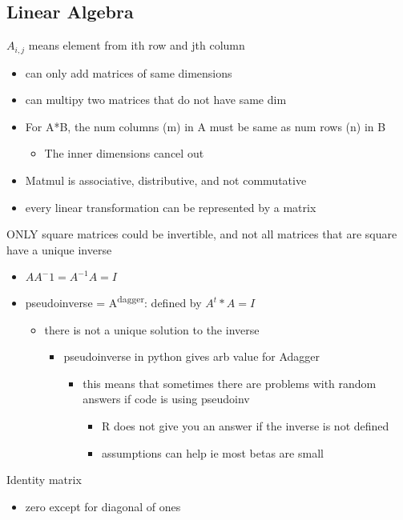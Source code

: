 \documentclass[a4paper]{article}
\begin{document}
\subsection{Linear Algebra}
\label{sec:org61be2e5}
\(A_{i,j}\) means element from ith row and jth column
\begin{itemize}
\item can only add matrices of same dimensions
\item can multipy two matrices that do not have same dim
\item For A*B, the num columns (m) in A must be same as num rows (n) in B
\begin{itemize}
\item The inner dimensions cancel out
\end{itemize}
\item Matmul is associative, distributive, and not commutative
\item every linear transformation can be represented by a matrix
\end{itemize}
ONLY square matrices could be invertible, and not all matrices that are square have a unique inverse
\begin{itemize}
\item \(AA^-1 = A^{-1}A = I\)
\item pseudoinverse = A\textsuperscript{dagger}: defined by \(A^t * A = I\)
\begin{itemize}
\item there is not a unique solution to the inverse
\begin{itemize}
\item pseudoinverse in python gives arb value for Adagger
\begin{itemize}
\item this means that sometimes there are problems with random answers if code is using pseudoinv
\begin{itemize}
\item R does not give you an answer if the inverse is not defined
\item assumptions can help ie most betas are small
\end{itemize}
\end{itemize}
\end{itemize}
\end{itemize}
\end{itemize}
Identity matrix
\begin{itemize}
\item zero except for diagonal of ones
\end{itemize}
\end{document}
